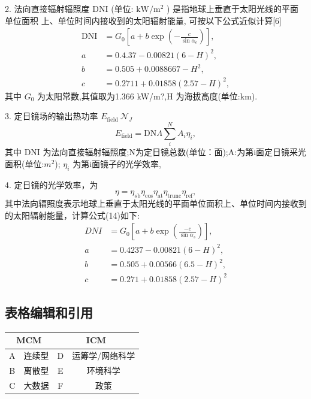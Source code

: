 \documentclass[a4paper,12pt]{article}
\begin{document}
2. 法向直接辐射辐照度 DNI (单位: \(\mathrm{kW} / \mathrm{m}^{2}\) ) 是指地球上垂直于太阳光线的平面单位面积
上、单位时间内接收到的太阳辐射能量, 可按以下公式近似计算[6]
\begin{equation}
    \begin{split}
        \mathrm{DNI} &= G_{0}\left[a + b \exp\left(-\frac{c}{\sin\alpha_{e}}\right)\right],\\ 
        a &= 0.4.37 - 0.00821(6-H)^{2},\\ 
        b &= 0.505 + 0.0088667-H^{2},\\ 
        c &= 0.2711 + 0.01858(2.57-H)^{2},
    \end{split}
\end{equation}
其中
$G_{\mathrm{0}}$ 
为太阳常数,其值取为1.366 kW/m?,H 为海拔高度(单位:km).

3. 定日镜场的输出热功率
$E_{\mathrm{field}}\ {\mathcal{N}}_{J}$ 
\begin{equation}
    E_{\mathrm{field}} = \mathrm{DN}\Lambda\sum_{i}^{N}A_{i}\eta_{i},
\end{equation}
其中 DNI 为法向直接辐射辐照度;N为定日镜总数(单位：面);A:为第i面定日镜采光
面积(单位:$m^{2}$);
$\eta_{i}$ 
为第i面镜子的光学效率,

4. 定日镜的光学效率，为
\begin{equation}
    \eta = \eta_{s\mathrm{b}}\eta_{\mathrm{cos}}\eta_{\mathrm{at}}\eta_{\mathrm{trunc}}\eta_{\mathrm{ref}},
\end{equation}
其中法向辐照度表示地球上垂直于太阳光线的平面单位面积上、单位时间内接收到的太阳辐射能量，计算公式(14)如下:
\begin{equation}
    \begin{split}
        D N I &= G_{0}\left[a + b \exp\left(\frac{-c}{\sin \alpha_{s}}\right)\right], \\
        a &= 0.4237 - 0.00821(6 - H)^{2}, \\
        b &= 0.505 + 0.00566(6.5 - H)^{2}, \\
        c &= 0.271 + 0.01858(2.57 - H)^{2}
    \end{split}
\end{equation}

\subsection{表格编辑和引用}
    \begin{tabular}{|c|c|c|c|}
        \hline
        \multicolumn{2}{|c|}{MCM} & \multicolumn{2}{|c|}{ICM} \\
        \hline
        A & 连续型 & D & 运筹学/网络科学\\
        \hline
        B & 离散型 & E & 环境科学\\
        \hline
        C & 大数据 & F & 政策\\
        \hline
    \end{tabular}
    
\end{document}
